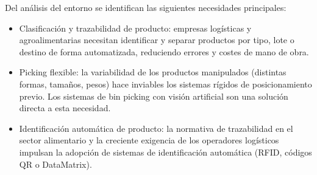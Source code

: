 Del análisis del entorno se identifican las siguientes necesidades principales:

\begin{itemize}
	\item Clasificación y trazabilidad de producto: empresas logísticas y agroalimentarias necesitan identificar y separar productos por tipo, lote o destino de forma automatizada, reduciendo errores y costes de mano de obra.

	\item Picking flexible: la variabilidad de los productos manipulados (distintas formas, tamaños, pesos) hace inviables los sistemas rígidos de posicionamiento previo. Los sistemas de bin picking con visión artificial son una solución directa a esta necesidad.

	\item Identificación automática de producto: la normativa de trazabilidad en el sector alimentario y la creciente exigencia de los operadores logísticos impulsan la adopción de sistemas de identificación automática (RFID, códigos QR o DataMatrix).
\end{itemize}
